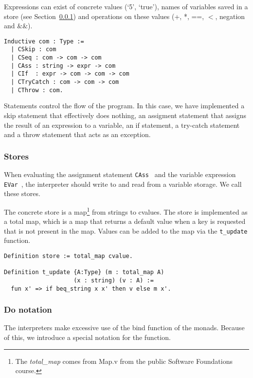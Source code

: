 Expressions can exist of concrete values (`5', `true'), names of variables
saved in a store (see Section~\ref{sec:stores}) and operations on these values
(+, *, ==, $<$, negation and $\&\&$). 

\begin{listing}
\begin{verbatim}
Inductive com : Type :=
  | CSkip : com
  | CSeq : com -> com -> com
  | CAss : string -> expr -> com
  | CIf  : expr -> com -> com -> com
  | CTryCatch : com -> com -> com
  | CThrow : com. 
\end{verbatim}
\end{listing}

Statements control the flow of the program. In this case, we have implemented a
skip statement that effectively does nothing, an assigment statement that
assigns the result of an expression to a variable, an if statement, a try-catch
statement and a throw statement that acts as an exception.

\subsubsection{Stores}\label{sec:stores}
When evaluating the assignment statement \texttt{CAss } and the variable
expression \texttt{EVar }, the interpreter should write to and read from a variable
storage. We call these stores. 

The concrete store is a map\footnote{The \textit{total\_map} comes from 
	Map.v from the public Software Foundations course.} 
from strings to cvalues. The store is implemented as a total map, which is a
map that returns a default value when a key is requested that is not present in
the map. Values can be added to the map via the \texttt{t_update }
function.

\begin{listing}
\begin{verbatim}
Definition store := total_map cvalue.

Definition t_update {A:Type} (m : total_map A)
                    (x : string) (v : A) :=
  fun x' => if beq_string x x' then v else m x'.

\end{verbatim}
\end{listing}

\subsubsection{Do notation}
The interpreters make excessive use of the bind function of the monads.
Because of this, we introduce a special notation for the function.

